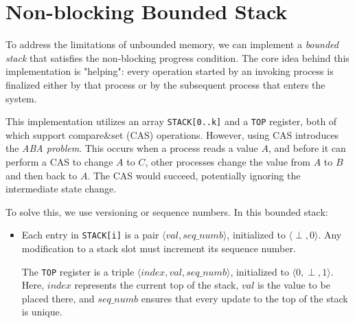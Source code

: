 \section{Non-blocking Bounded Stack}
To address the limitations of unbounded memory, we can implement a \textit{bounded stack} that satisfies the non-blocking progress condition. The core idea behind this implementation is "helping": every operation started by an invoking process is finalized either by that process or by the subsequent process that enters the system.

This implementation utilizes an array \texttt{STACK[0..k]} and a \texttt{TOP} register, both of which support compare\&set (CAS) operations. However, using CAS introduces the \textit{ABA problem}. This occurs when a process reads a value $A$, and before it can perform a CAS to change $A$ to $C$, other processes change the value from $A$ to $B$ and then back to $A$. The CAS would succeed, potentially ignoring the intermediate state change.

To solve this, we use versioning or sequence numbers. In this bounded stack:
\begin{itemize}
    \item Each entry in \texttt{STACK[i]} is a pair $\langle val,seq\_numb\rangle$, initialized to $\langle \perp,0\rangle$. Any modification to a stack slot must increment its sequence number.

    The \texttt{TOP} register is a triple $\langle index,val,seq\_numb\rangle$, initialized to $\langle 0,\perp,1\rangle$. Here, $index$ represents the current top of the stack, $val$ is the value to be placed there, and $seq\_numb$ ensures that every update to the top of the stack is unique.
\end{itemize}

